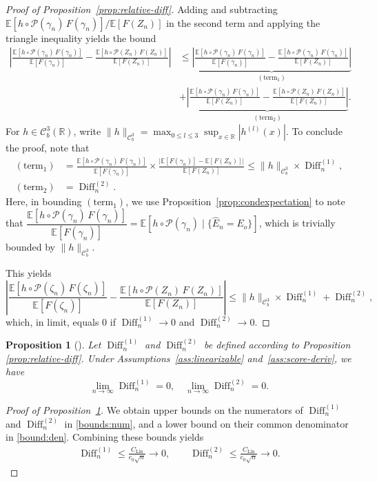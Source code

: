 \documentclass[12pt]{article}
\newcommand{\RD}{\operatorname{Diff}}
\newtheorem{proposition}{Proposition}[section]
\newcommand{\real}{\mathbb{R}}
\newcommand{\Ee}{{\mathbb{E}}}
\newcommand{\cP}{{\mathcal{P}}}
\begin{document}
\begin{appendices}
\begin{proof}[Proof of Proposition~\ref{prop:relative-diff}]
Adding and subtracting
$\Ee[h\circ\cP(\gamma_n)\,F(\gamma_n)]/\Ee[F(Z_n)]$ in the second term
and applying the triangle inequality yields the bound
\begin{align*}
  \left|
    \frac{\Ee[h\circ\cP(\gamma_n)\,F(\gamma_n)]}{\Ee[F(\gamma_n)]}
    -\frac{\Ee[h\circ\cP(Z_n)\,F(Z_n)]}{\Ee[F(Z_n)]}
  \right|
  &\le
  \underbrace{
    \left|
      \frac{\Ee[h\circ\cP(\gamma_n)\,F(\gamma_n)]}{\Ee[F(\gamma_n)]}
      -\frac{\Ee[h\circ\cP(\gamma_n)\,F(\gamma_n)]}{\Ee[F(Z_n)]}
    \right|
  }_{(\mathrm{term}_1)}\\
  &+ \underbrace{
    \left|
      \frac{\Ee[h\circ\cP(\gamma_n)\,F(\gamma_n)]}{\Ee[F(Z_n)]}
      -\frac{\Ee[h\circ\cP(Z_n)\,F(Z_n)]}{\Ee[F(Z_n)]}
    \right|
  }_{(\mathrm{term}_2)}.
\end{align*}
For $h\in\mathcal C^3_b(\real)$, write
$\|h\|_{\mathcal C^3_b}=\max_{0\le l\le 3}\sup_{x\in\real}|h^{(l)}(x)|$. 
To conclude the proof, note that
\begin{align*}
  (\mathrm{term}_1)
  &=\frac{\Ee[h\circ\cP(\gamma_n)\,F(\gamma_n)]}{\Ee[F(\gamma_n)]}
   \times
   \frac{\big|\Ee[F(\gamma_n)]-\Ee[F(Z_n)]\big|}{\Ee[F(Z_n)]}
   \le\|h\|_{\mathcal C^3_b}\times\RD_n^{(1)},\\
  (\mathrm{term}_2)
  &=\RD_n^{(2)}.
\end{align*}
Here, in bounding $(\mathrm{term}_1)$, we use Proposition~\ref{prop:condexpectation} to note that
$\dfrac{\Ee[h\circ\cP(\gamma_n)\,F(\gamma_n)]}{\Ee[F(\gamma_n)]}
=\Ee[h\circ\cP(\gamma_n)\mid\{\widehat E_n=E_o\}]$, which is trivially bounded by $\|h\|_{\mathcal C^3_b}$. 

This yields
$$
\left|
    \frac{\Ee[h\circ\cP(\zeta_n)\,F(\zeta_n)]}{\Ee[F(\zeta_n)]}
    -\frac{\Ee[h\circ\cP(Z_n)\,F(Z_n)]}{\Ee[F(Z_n)]}
  \right| \le \|h\|_{\mathcal C^3_b}\times \RD_n^{(1)}+\RD_n^{(2)},
$$
which, in limit, equals $0$ if $\RD_n^{(1)}\to0$ and $\RD_n^{(2)}\to 0$.
\end{proof}

\begin{proposition}[]
\label{prop:diff-vanish}
Let $\RD_n^{(1)}$ and $\RD_n^{(2)}$ be defined according to Proposition \ref{prop:relative-diff}.
Under Assumptions~\ref{ass:linearizable} and~\ref{ass:score-deriv}, we have
   $$
   \lim_{n  \to \infty} \RD_n^{(1)}=0, \quad \lim_{n  \to \infty}  \RD_n^{(2)}=0. 
   $$ 
\end{proposition}


\begin{proof}[Proof of Proposition~\ref{prop:diff-vanish}]
We obtain upper bounds on the numerators of $\RD_n^{(1)}$ and $\RD_n^{(2)}$ in \eqref{bounds:num}, and a lower bound on their common denominator in \eqref{bound:den}. 
Combining these bounds yields
\begin{align*}
  \RD_n^{(1)}\le\frac{C_{\mathrm{Lin}}}{c_0\sqrt n}\to0,
  \qquad
  \RD_n^{(2)}\le\frac{C_{\mathrm{Lin}}}{c_0\sqrt n}\to0.
\end{align*}


\end{proof}
\end{appendices}
\end{document}
